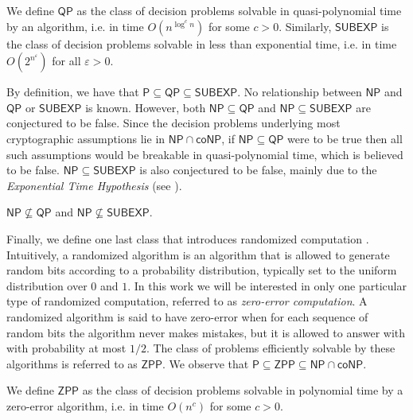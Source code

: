 \begin{definition}
  We define $\mathsf{QP}$ as the class of decision problems solvable in quasi-polynomial time by an algorithm, i.e. in time $O(n^{\log^c n})$ for some $c > 0$. Similarly, $\mathsf{SUBEXP}$ is the class of decision problems solvable in less than exponential time, i.e. in time $O(2^{n^\varepsilon})$ for all $\varepsilon > 0$.
\end{definition}

By definition, we have that $\mathsf{P} \subseteq \mathsf{QP} \subseteq \mathsf{SUBEXP}$. No relationship between $\mathsf{NP}$ and $\mathsf{QP}$ or $\mathsf{SUBEXP}$ is known. However, both $\mathsf{NP} \subseteq \mathsf{QP}$ and $\mathsf{NP} \subseteq \mathsf{SUBEXP}$ are conjectured to be false. Since the decision problems underlying most cryptographic assumptions lie in $\mathsf{NP} \cap \mathsf{coNP}$, if $\mathsf{NP} \subseteq \mathsf{QP}$ were to be true then all such assumptions would be breakable in quasi-polynomial time, which is believed to be false. $\mathsf{NP} \subseteq \mathsf{SUBEXP}$ is also conjectured to be false, mainly due to the \textit{Exponential Time Hypothesis} (see ).

\begin{conjecture}
  $\mathsf{NP} \not\subseteq \mathsf{QP}$ and $\mathsf{NP} \not\subseteq \mathsf{SUBEXP}$.
\end{conjecture}

Finally, we define one last class that introduces randomized computation \cite{gill_zpp}. Intuitively, a randomized algorithm is an algorithm that is allowed to generate random bits according to a probability distribution, typically set to the uniform distribution over $0$ and $1$. In this work we will be interested in only one particular type of randomized computation, referred to as \textit{zero-error computation}. A randomized algorithm is said to have zero-error when for each sequence of random bits the algorithm never makes mistakes, but it is allowed to answer with  with probability at most $1/2$. The class of problems efficiently solvable by these algorithms is referred to as $\mathsf{ZPP}$. We observe that $\mathsf{P} \subseteq \mathsf{ZPP} \subseteq \mathsf{NP} \cap \mathsf{coNP}$.

\begin{definition}
  We define $\mathsf{ZPP}$ as the class of decision problems solvable in polynomial time by a zero-error algorithm, i.e. in time $O(n^c)$ for some $c > 0$.
\end{definition}

